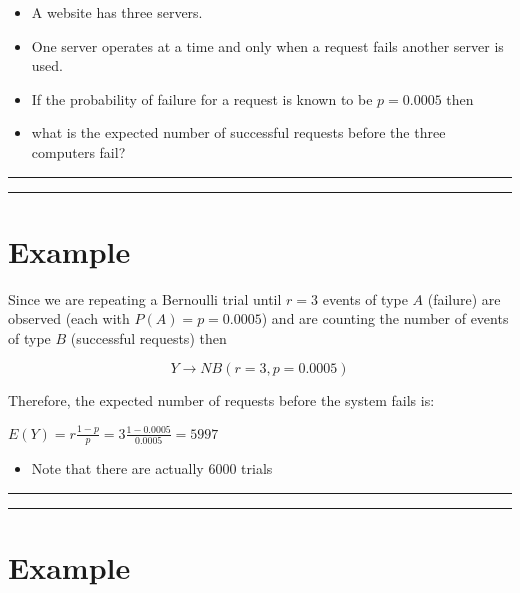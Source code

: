 \documentclass[
]{book}
\providecommand{\tightlist}{%
  \setlength{\itemsep}{0pt}\setlength{\parskip}{0pt}}
\begin{document}
\begin{itemize}
\item
  A website has three servers.
\item
  One server operates at a time and only when a request fails another server is used.
\item
  If the probability of failure for a request is known to be \(p=0.0005\) then
\item
  what is the expected number of successful requests before the three computers fail?
\end{itemize}

\begin{center}\rule{0.5\linewidth}{0.5pt}\end{center}

\begin{center}\rule{0.5\linewidth}{0.5pt}\end{center}

\hypertarget{example-10}{%
\section{Example}\label{example-10}}

Since we are repeating a Bernoulli trial until \(r=3\) events of type \(A\) (failure) are observed (each with \(P(A)=p=0.0005\)) and are counting the number of events of type \(B\) (successful requests) then

\[Y \rightarrow NB(r=3, p=0.0005)\]

Therefore, the expected number of requests before the system fails is:

\(E(Y)=r\frac{1-p}{p}=3\frac{1-0.0005}{0.0005}=5997\)

\begin{itemize}
\tightlist
\item
  Note that there are actually \(6000\) trials
\end{itemize}

\begin{center}\rule{0.5\linewidth}{0.5pt}\end{center}

\begin{center}\rule{0.5\linewidth}{0.5pt}\end{center}

\hypertarget{example-11}{%
\section{Example}\label{example-11}}
\end{document}
